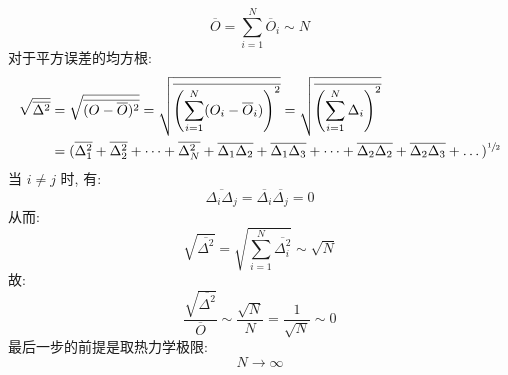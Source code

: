\begin{itemize}
        \begin{equation}
            \overline{O} = \sum_{i = 1}^{N} \overline{O}_i \sim N
        \end{equation}
        对于平方误差的均方根:
        \begin{align}
            \sqrt{\overline{\Delta^2}} 
            & = \sqrt{\overline{(O - \overline{O})^2}} = \sqrt{\overline{\left(\sum_{i = 1}^{N}(O_i - \overline{O}_i)\right)^2}} = \sqrt{\overline{\left(\sum_{i = 1}^{N} \Delta_i \right)^2}} \\
            & = (\overline{\Delta_1^2} + \overline{\Delta_2^2} + \dots + \overline{\Delta_N^2} + \overline{\Delta_1\Delta_2} + \overline{\Delta_1\Delta_3} + \dots + \overline{\Delta_2\Delta_2} + \overline{\Delta_2\Delta_3} + \dots)^{\sfrac{1}{2}}
        \end{align}
        当 $ i \neq j $ 时, 有: 
        \begin{equation}
            \overline{\Delta_i \Delta_j} = \overline{\Delta_i}\overline{\Delta_j} = 0
        \end{equation}
        从而:
        \begin{equation}
            \sqrt{\overline{\Delta^2}} = \sqrt{\sum_{i = 1}^{N} \overline{\Delta_i^2}} \sim \sqrt{N}
        \end{equation}
        故:
        \begin{equation}
            \dfrac{\sqrt{\overline{\Delta^2}}}{\overline{O}} \sim \dfrac{\sqrt{N}}{N} = \dfrac{1}{\sqrt{N}} \sim 0
        \end{equation}
        最后一步的前提是取热力学极限:
        \begin{equation}
            N \rightarrow \infty
        \end{equation}
\end{itemize}

